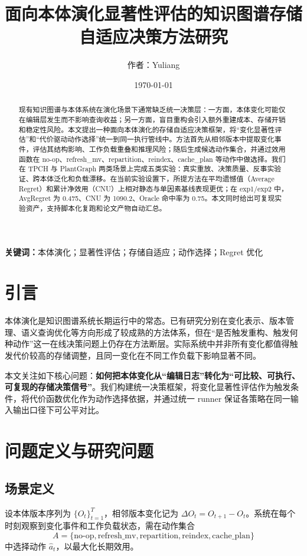 \documentclass[12pt,a4paper]{ctexart}
\title{面向本体演化显著性评估的知识图谱存储自适应决策方法研究}
\author{作者：Yuliang}
\date{\today}
\begin{document}
\maketitle

\begin{abstract}
现有知识图谱与本体系统在演化场景下通常缺乏统一决策层：一方面，本体变化可能仅在编辑层发生而不影响查询收益；另一方面，盲目重构会引入额外重建成本、存储开销和稳定性风险。本文提出一种面向本体演化的存储自适应决策框架，将“变化显著性评估”和“代价驱动动作选择”统一到同一执行管线中。方法首先从相邻版本中提取变化事件，评估其结构影响、工作负载重叠和推理风险；随后生成候选动作集合，并通过效用函数在 no-op、refresh\_mv、repartition、reindex、cache\_plan 等动作中做选择。我们在 TPCH 与 PlantGraph 两类场景上完成五类实验：真实重放、决策质量、反事实验证、跨本体泛化和负载漂移。在当前实验设置下，所提方法在平均遗憾值（Average Regret）和累计净效用（CNU）上相对静态与单因素基线表现更优；在 exp1/exp2 中，AvgRegret 为 0.475、CNU 为 1090.2、Oracle 命中率为 0.75。本文同时给出可复现实验资产，支持脚本化复跑和论文产物自动汇总。
\end{abstract}

\textbf{关键词：}本体演化；显著性评估；存储自适应；动作选择；Regret 优化

\section{引言}
本体演化是知识图谱系统长期运行中的常态。已有研究分别在变化表示、版本管理、语义查询优化等方向形成了较成熟的方法体系\cite{flouris2008ontology,noy2004promptdiff,neumann2010rdf3x}，但在“是否触发重构、触发何种动作”这一在线决策问题上仍存在方法断层。实际系统中并非所有变化都值得触发代价较高的存储调整，且同一变化在不同工作负载下影响显著不同。

本文关注如下核心问题：\textbf{如何把本体变化从“编辑日志”转化为“可比较、可执行、可复现的存储决策信号”}。我们构建统一决策框架，将变化显著性评估作为触发条件，将代价函数优化作为动作选择依据，并通过统一 runner 保证各策略在同一输入输出口径下可公平对比。

\section{问题定义与研究问题}
\subsection{场景定义}
设本体版本序列为 $\{O_t\}_{t=1}^{T}$，相邻版本变化记为 $\Delta O_t = O_{t+1}-O_t$。系统在每个时刻观察到变化事件和工作负载状态，需在动作集合
\[
A=\{\text{no-op},\text{refresh\_mv},\text{repartition},\text{reindex},\text{cache\_plan}\}
\]
中选择动作 $\hat{a}_t$，以最大化长期效用。
\end{document}
